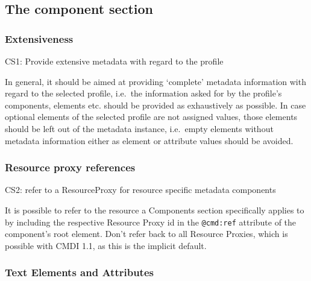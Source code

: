 \subsection{The component section}\label{the-component-section}

\subsubsection{Extensiveness}\label{extensiveness}

\label{cs1}
CS1: Provide extensive metadata with regard to the profile


In general, it should be aimed at providing `complete' metadata information with regard to the selected profile, i.e.~the information asked for by the profile's components, elements etc. should be provided as exhaustively as possible. In case optional elements of the selected profile are not assigned values, those elements should be left out of the metadata instance, i.e.~empty elements without metadata information either as element or attribute values should be avoided.

\subsubsection{Resource proxy
references}\label{resource-proxy-references}

\label{cs2}
CS2: refer to a ResourceProxy for resource specific metadata components


It is possible to refer to the resource a Components section
specifically applies to by including the respective Resource Proxy id in the \texttt{@cmd:ref} attribute of the component's root element. Don't refer back to all Resource Proxies, which is possible with CMDI 1.1, as this is the implicit default.

\subsubsection{Text Elements and Attributes} \label{text-elements-attributes}

